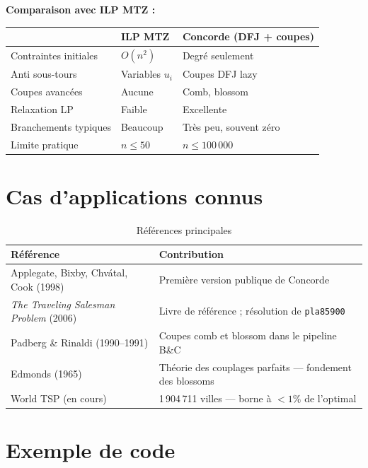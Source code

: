 \documentclass[12pt, a4paper]{article}
\begin{document}
\medskip
\textbf{Comparaison avec ILP MTZ :}

\begin{center}
\begin{tabular}{lll}
  \toprule
  & \textbf{ILP MTZ} & \textbf{Concorde (DFJ + coupes)} \\
  \midrule
  Contraintes initiales & $O(n^2)$ & Degré seulement \\
  Anti sous-tours       & Variables $u_i$ & Coupes DFJ lazy \\
  Coupes avancées       & Aucune & Comb, blossom \\
  Relaxation LP         & Faible & Excellente \\
  Branchements typiques & Beaucoup & Très peu, souvent zéro \\
  Limite pratique       & $n \leq 50$ & $n \leq 100\,000$ \\
  \bottomrule
\end{tabular}
\end{center}

\section{Cas d'applications connus}

\begin{table}[h]
  \centering
  \begin{tabular}{ll}
    \toprule
    \textbf{Référence} & \textbf{Contribution} \\
    \midrule
    Applegate, Bixby, Chvátal, Cook (1998)  & Première version publique de Concorde \\
    \textit{The Traveling Salesman Problem} (2006) & Livre de référence ; résolution de \texttt{pla85900} \\
    Padberg \& Rinaldi (1990--1991) & Coupes comb et blossom dans le pipeline B\&C \\
    Edmonds (1965) & Théorie des couplages parfaits --- fondement des blossoms \\
    World TSP (en cours) & 1\,904\,711 villes --- borne à $< 1\%$ de l'optimal \\
    \bottomrule
  \end{tabular}
  \caption{Références principales}
\end{table}

\section{Exemple de code}
\end{document}
